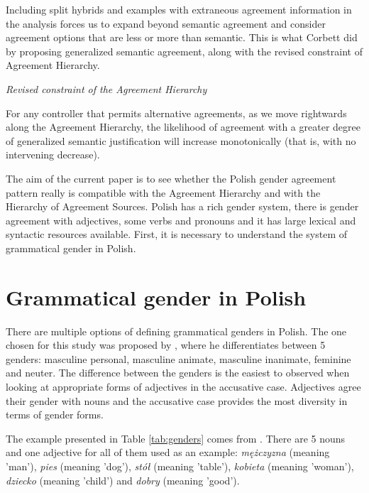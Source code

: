 Including split hybrids and examples with extraneous agreement information in the analysis forces us to expand beyond semantic agreement and consider agreement options that are less or more than semantic. This is what Corbett did by proposing generalized semantic agreement, along with the revised constraint of Agreement Hierarchy.

\begin{exe}
  \ex\label{const:agreement-hierarchy-revised}
  \textit{Revised constraint of the Agreement Hierarchy}
  
  For any controller that permits alternative agreements, as we move rightwards along the Agreement Hierarchy, the likelihood of agreement with a greater degree of generalized semantic justification will increase monotonically (that is, with no intervening decrease).
\end{exe}

The aim of the current paper is to see whether the Polish gender agreement pattern really is compatible with the Agreement Hierarchy and with the Hierarchy of Agreement Sources. Polish has a rich gender system, there is gender agreement with adjectives, some verbs and pronouns and it has large lexical and syntactic resources available. First, it is necessary to understand the system of grammatical gender in Polish.

\section{Grammatical gender in Polish}
There are multiple options of defining grammatical genders in Polish. The one chosen for this study was proposed by \cite{manczak_ile_1956}, where he differentiates between 5 genders: masculine personal, masculine animate, masculine inanimate, feminine and neuter. The difference between the genders is the easiest to observed when looking at appropriate forms of adjectives in the accusative case. Adjectives agree their gender with nouns and the accusative case provides the most diversity in terms of gender forms.

The example presented in Table \ref{tab:genders} comes from \cite{manczak_ile_1956}. There are 5 nouns and one adjective for all of them used as an example: \textsl{mężczyzna} (meaning 'man'), \textsl{pies} (meaning 'dog'), \textsl{stół} (meaning 'table'), \textsl{kobieta} (meaning 'woman'), \textsl{dziecko} (meaning 'child') and \textsl{dobry} (meaning 'good').

